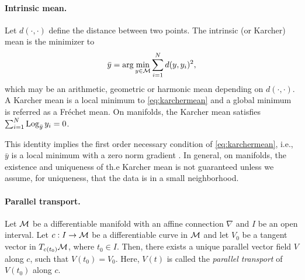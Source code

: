 \paragraph{Intrinsic mean.} 
Let $d(\cdot,\cdot)$ define the distance between two points. The intrinsic (or Karcher) mean is the minimizer to
{\small \begin{equation}
\label{eq:karchermean}
\bar{y} = \arg \min_{y \in \mathcal{M}} \sum_{i=1}^{N} d(y,y_{i})^{2}, 
\end{equation}}
which may be an arithmetic, geometric or harmonic mean depending on $d(\cdot,\cdot)$. A Karcher mean is a local minimum to \eqref{eq:karchermean} and a global minimum is referred as a Fr\'{e}chet mean. On manifolds, the Karcher mean satisfies $\sum_{i=1}^{N} \operatorname*{Log}_{\bar{y}}y_i =0$.

\iffalse
 \begin{figure}
 \begin{center}
 \begin{minipage}{.45\linewidth} 
 \begin{algorithmic}[plain]
 \STATE \textbf{Algorithm 1 : Karcher mean}
 \STATE Input: $y_{1}, \ldots, y_{N} \in \Mc$, $\alpha$
 \STATE Output: $\bar{y} \in \Mc$
 \STATE $\bar{y}_{0} = y_{1}$
 \WHILE {$ \| \sum_{i=1}^{N} \LOG(\bar{y}_{k},y_{i})\| > \epsilon$}
 \STATE $\Delta\bar{y} = \frac{\alpha}{N} \sum_{i=1}^{N}\LOG (\bar{y}_k,y_i)$
 \STATE $\bar{y}_{k+1} = \EXP(\bar{y}_k,\Delta \bar{y})$
 \ENDWHILE
  \end{algorithmic}
  \end{minipage}
  \end{center}
 \caption{Karcher mean on manifolds}
     \label{alg:karcher} 
 \end{figure}
 \fi
 
This identity implies the first order necessary condition of \eqref{eq:karchermean}, i.e., $\bar{y}$ is a local minimum with a zero norm gradient \citep{karcher1977riemannian}. In general, on manifolds, the existence and uniqueness of th.e Karcher mean is not guaranteed unless we assume, for uniqueness, that the data is in a small neighborhood.\\

\paragraph{Parallel transport.} 
Let $\mathcal{M}$ be a differentiable manifold with an affine connection $\nabla$ and $I$ be an open interval. Let $c:I \rightarrow \mathcal{M}$ be a differentiable curve in $\mathcal{M}$ and let $V_0$ be a tangent vector in $T_{c(t_0)}\mathcal{M}$, where $t_{0} \in I$. 
Then, there exists a unique parallel vector field $V$ along $c$, such that $V(t_0)=V_0$. Here, $V(t)$ is called the \textit{parallel transport} of $V(t_0)$ along $c$. 

